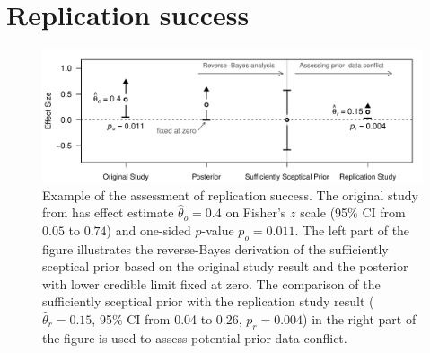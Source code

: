 \section{Replication success}\label{sec1:RS}

\begin{center}
\begin{figure}[!h]
\begin{center}
\begin{knitrout}
\color{fgcolor}

{\centering \includegraphics[width=\maxwidth]{images/paper1/fig1-1}

}

\end{knitrout}
\caption{Example of the assessment of replication success. The original study
  from \citet{Pyc2010} has effect estimate $\hat \theta_o= 0.4$ on Fisher's $z$
  scale (95\% CI from $0.05$ to $0.74$) and one-sided $p$-value $p_o = 0.011$.
  The left part of the figure illustrates the reverse-Bayes derivation of the
  sufficiently sceptical prior based on the original study result and the
  posterior with lower credible limit fixed at zero. The comparison of the
  sufficiently sceptical prior with the replication study result
  ($\hat \theta_r = 0.15$, 95\% CI from 0.04 to 0.26, $p_r = 0.004$) in the
  right part of the figure is used to assess potential prior-data conflict.}
  \label{fig1:fig1}
\end{center}
\end{figure}
\end{center}



